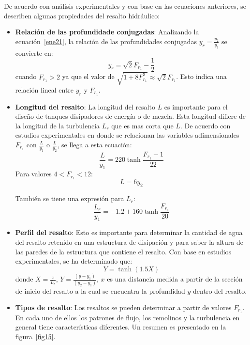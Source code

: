 \documentclass[11pt, oneside]{article}
\begin{document}
De acuerdo con an\'alisis experimentales y con base en las ecuaciones anteriores, se describen algunas propiedades del resalto hidr\'aulico:
\begin{itemize}
\item \textbf{Relaci\'on de las profundidade conjugadas}: Analizando la ecuaci\'on~\ref{ene21}, la relaci\'on de las profundidades conjugadas $y_r = \frac{y_2}{y_1}$ se convierte en:
$$
y_r = \sqrt{2} F_{r_1} - \frac{1}{2}
$$
cuando $F_{r_1} > 2$ ya que el valor de $\sqrt{1+8F_{r_1}^2} \approx \sqrt{2} F_{r_1}$. Esto indica una relaci\'on lineal entre $y_r$ y $F_{r_1}$.

\item \textbf{Longitud del resalto}: La longitud del resalto $L$ es importante para el diseño de tanques disipadores de energía o de mezcla. Esta longitud difiere de la longitud de la turbulencia $L_r$ que es mas corta que $L$. De acuerdo con estudios experimentales en donde se relacionan las variables adimensionales $F_{r_1}$ con $\frac{L}{y_1}$ o $\frac{L}{y_2}$, se llega a esta ecuaci\'on:
$$
\frac{L}{y_1} = 220 \tanh \frac{F_{r_1}-1}{22}
$$
Para valores $4 < F_{r_1} < 12$:
$$
L = 6 y_2
$$

Tambi\'en se tiene una expresi\'on para $L_r$:
$$
\frac{L_r}{y_1} = -1.2 + 160 \tanh \frac{F_{r_1}}{20}
$$

\item \textbf{Perfil del resalto}: Esto es importante para determinar la cantidad de agua del resalto retenido en una estructura de disipación y para saber la altura de las paredes de la estructura que contiene el resalto. Con base en estudios experimentales, se ha determinado que:
$$
Y = \tanh (1.5 X)
$$
donde $X=\frac{x}{L_r}$, $Y=\frac{(y - y_1)}{( y_2 - y_1)}$, $x$ es una  distancia medida a partir de la secci\'on de inicio del resalto a la cual se encuentra la profundidad $y$ dentro del resalto.

\item \textbf{Tipos de resalto}: Los resaltos se pueden determinar a partir de valores $F_{r_1}$. En cada uno de ellos los patrones de flujo, los remolinos y la turbulencia en general tiene características diferentes. Un resumen es presentado en la figura~\ref{fig15}.


\end{itemize}
\end{document}
